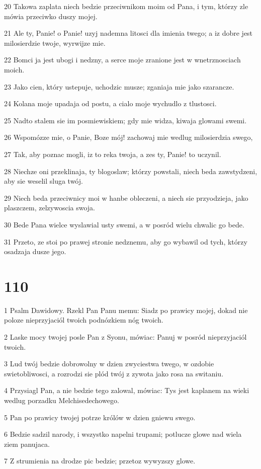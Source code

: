 \par 20 Takowa zaplata niech bedzie przeciwnikom moim od Pana, i tym, którzy zle mówia przeciwko duszy mojej.
\par 21 Ale ty, Panie! o Panie! uzyj nademna litosci dla imienia twego; a iz dobre jest milosierdzie twoje, wyrwijze mie.
\par 22 Bomci ja jest ubogi i nedzny, a serce moje zranione jest w wnetrznosciach moich.
\par 23 Jako cien, który ustepuje, uchodzic musze; zganiaja mie jako szarancze.
\par 24 Kolana moje upadaja od postu, a cialo moje wychudlo z tlustosci.
\par 25 Nadto stalem sie im posmiewiskiem; gdy mie widza, kiwaja glowami swemi.
\par 26 Wspomózze mie, o Panie, Boze mój! zachowaj mie wedlug milosierdzia swego,
\par 27 Tak, aby poznac mogli, iz to reka twoja, a zes ty, Panie! to uczynil.
\par 28 Niechze oni przeklinaja, ty blogoslaw; którzy powstali, niech beda zawstydzeni, aby sie weselil sluga twój.
\par 29 Niech beda przeciwnicy moi w hanbe obleczeni, a niech sie przyodzieja, jako plaszczem, zelzywoscia swoja.
\par 30 Bede Pana wielce wyslawial usty swemi, a w posród wielu chwalic go bede.
\par 31 Przeto, ze stoi po prawej stronie nedznemu, aby go wybawil od tych, którzy osadzaja dusze jego.

\chapter{110}

\par 1 Psalm Dawidowy. Rzekl Pan Panu memu: Siadz po prawicy mojej, dokad nie poloze nieprzyjaciól twoich podnózkiem nóg twoich.
\par 2 Laske mocy twojej posle Pan z Syonu, mówiac: Panuj w posród nieprzyjaciól twoich.
\par 3 Lud twój bedzie dobrowolny w dzien zwyciestwa twego, w ozdobie swietobliwosci, a rozrodzi sie plód twój z zywota jako rosa na switaniu.
\par 4 Przysiagl Pan, a nie bedzie tego zalowal, mówiac: Tys jest kaplanem na wieki wedlug porzadku Melchisedechowego.
\par 5 Pan po prawicy twojej potrze królów w dzien gniewu swego.
\par 6 Bedzie sadzil narody, i wszystko napelni trupami; potlucze glowe nad wiela ziem panujaca.
\par 7 Z strumienia na drodze pic bedzie; przetoz wywyzszy glowe.

